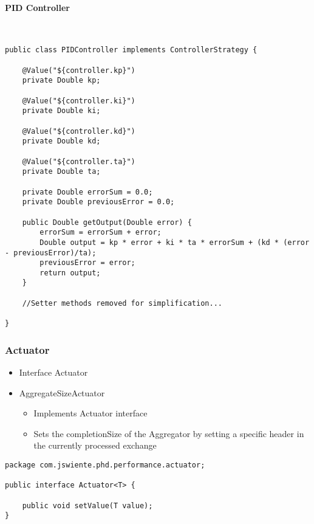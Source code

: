 \paragraph{PID Controller}\mbox{}\\

\begin{lstlisting}[caption={Implementation of PID Controller},label=listing:ch5_pid_controller]
public class PIDController implements ControllerStrategy {
	
	@Value("${controller.kp}")
	private Double kp;
	
	@Value("${controller.ki}")
	private Double ki;
	
	@Value("${controller.kd}")
	private Double kd;
	
	@Value("${controller.ta}")
	private Double ta;
	
	private Double errorSum = 0.0;
	private Double previousError = 0.0;

	public Double getOutput(Double error) {
		errorSum = errorSum + error;
		Double output = kp * error + ki * ta * errorSum + (kd * (error - previousError)/ta);
		previousError = error;
		return output;
	}

	//Setter methods removed for simplification...

}

\end{lstlisting}

\subsubsection{Actuator}

\begin{itemize}
	\item Interface Actuator
	\item AggregateSizeActuator
	\begin{itemize}
		\item Implements Actuator interface
		\item Sets the completionSize of the Aggregator by setting a specific header in the currently processed exchange
	\end{itemize}
\end{itemize}
\begin{lstlisting}[caption={Actuator Interface},label=listing:ch5_actuator_interface]
package com.jswiente.phd.performance.actuator;

public interface Actuator<T> {

	public void setValue(T value);
}
\end{lstlisting}

